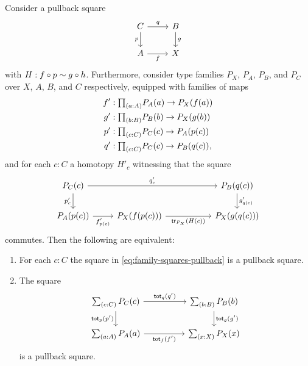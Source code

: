 \begin{lem}\label{lem:fiberwise-pullback}
Consider a pullback square
  \begin{equation*}
    \begin{tikzcd}
      C \arrow[r,"q"] \arrow[d,swap,"p"] & B \arrow[d,"g"] \\
      A \arrow[r,swap,"f"] & X
    \end{tikzcd}
  \end{equation*}
  with $H : f \circ p \sim g \circ h$. Furthermore, consider type families $P_X$, $P_A$, $P_B$, and $P_C$ over $X$, $A$, $B$, and $C$ respectively, equipped with families of maps
  \begin{align*}
    f' & : \prd{a:A} P_A(a) \to P_X(f(a)) \\
    g' & : \prd{b:B} P_B(b) \to P_X(g(b)) \\
    p' & : \prd{c:C} P_C(c) \to P_A(p(c)) \\
    q' & : \prd{c:C} P_C(c) \to P_B(q(c)),
  \end{align*}
  and for each $c:C$ a homotopy $H'_c$ witnessing that the square
  \begin{equation}\label{eq:family-squares-pullback}
    \begin{tikzcd}
      P_C(c) \arrow[rr,"{q'_c}"] \arrow[d,swap,"{p'_c}"] & &[3em] P_B(q(c)) \arrow[d,"{g'_{q(c)}}"] \\
      P_A(p(c)) \arrow[r,swap,"{f'_{p(c)}}"] & P_X(f(p(c))) \arrow[r,swap,"{\tr_{P_X}(H(c))}"] & P_X(g(q(c)))
    \end{tikzcd}
  \end{equation}
  commutes. Then the following are equivalent:
  \begin{enumerate}
  \item For each $c:C$ the square in \cref{eq:family-squares-pullback} is a pullback square.
  \item The square
    \begin{equation}\label{eq:total-square-pullback}
      \begin{tikzcd}[column sep=huge]
        \sm{c:C}P_C(c)
        \arrow[r,"{\total[q]{q'}}"] \arrow[d,swap,"{\total[p]{p'}}"] &
        \sm{b:B}P_B(b) \arrow[d,"{\total[g]{g'}}"] \\
        \sm{a:A}P_A(a) \arrow[r,swap,"{\total[f]{f'}}"] & \sm{x:X}P_X(x)
      \end{tikzcd}
    \end{equation}
    is a pullback square.
  \end{enumerate}
\end{lem}


